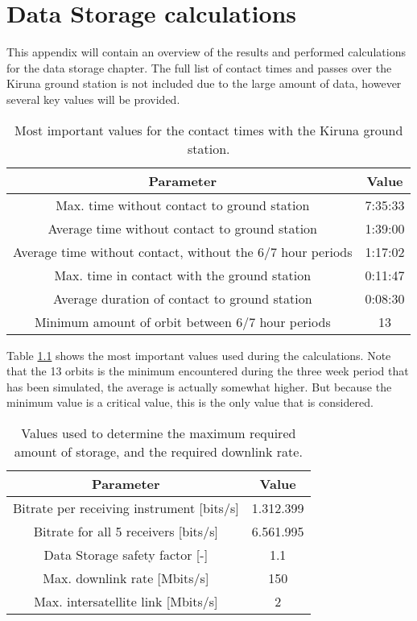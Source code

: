 \chapter{Data Storage calculations}
\label{DSAppendix}

This appendix will contain an overview of the results and performed calculations for the data storage chapter. The full list of contact times and passes over the Kiruna ground station is not included due to the large amount of data, however several key values will be provided.

\begin{table}[h]
\centering
\begin{tabular}{c|c}
\hline
\textbf{Parameter}  & \textbf{Value} \\\hline\hline
	Max. time without contact to ground station & 7:35:33 \\
	Average time without contact to ground station & 1:39:00  \\
	Average time without contact, without the 6/7 hour periods & 1:17:02\\
	Max. time in contact with the ground station & 0:11:47 \\
	Average duration of contact to ground station & 0:08:30 \\
  Minimum amount of orbit between 6/7 hour periods & 13 \\\hline
\end{tabular}
\caption{Most important values for the contact times with the Kiruna ground station.}
\label{KirunaTime}
\end{table}

Table \ref{KirunaTime} shows the most important values used during the calculations. Note that the 13 orbits is the minimum encountered during the three week period that has been simulated, the average is actually somewhat higher. But because the minimum value is a critical value, this is the only value that is considered.

\begin{table}[h]
\centering
\begin{tabular}{c|c}
\hline
\textbf{Parameter}  & \textbf{Value} \\\hline\hline
	Bitrate per receiving instrument [bits/s] & 1.312.399 \\
	Bitrate for all 5 receivers [bits/s] & 6.561.995 \\
	Data Storage safety factor [-] & 1.1 \\
	Max. downlink rate [Mbits/s] & 150 \\
	Max. intersatellite link [Mbits/s] & 2 \\\hline
\end{tabular}
\caption{Values used to determine the maximum required amount of storage, and the required downlink rate.}
\label{InputValues}
\end{table}

